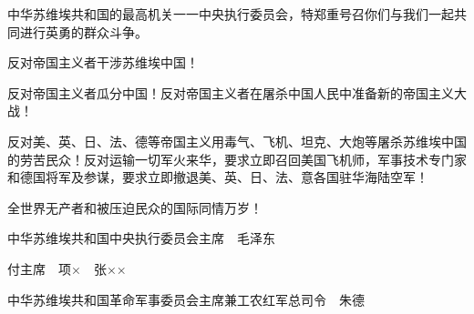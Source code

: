 中华苏维埃共和国的最高机关一一中央执行委员会，特郑重号召你们与我们一起共同进行英勇的群众斗争。

反对帝国主义者干涉苏维埃中国！

反对帝国主义者瓜分中国！反对帝国主义者在屠杀中国人民中准备新的帝国主义大战！

反对美、英、日、法、德等帝国主义用毒气、飞机、坦克、大炮等屠杀苏维埃中国的劳苦民众！反对运输一切军火来华，要求立即召回美国飞机师，军事技术专门家和德国将军及参谋，要求立即撤退美、英、日、法、意各国驻华海陆空军！

全世界无产者和被压迫民众的国际同情万岁！

中华苏维埃共和国中央执行委员会主席　毛泽东

付主席　项×　张××

中华苏维埃共和国革命军事委员会主席兼工农红军总司令　朱德